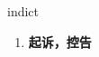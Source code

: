 
\begin{frame}
{\huge indict}
\begin{center}
\begin{enumerate}\Large
  \item \textbf{起诉，控告}
\end{enumerate}
\end{center}
\end{frame}
